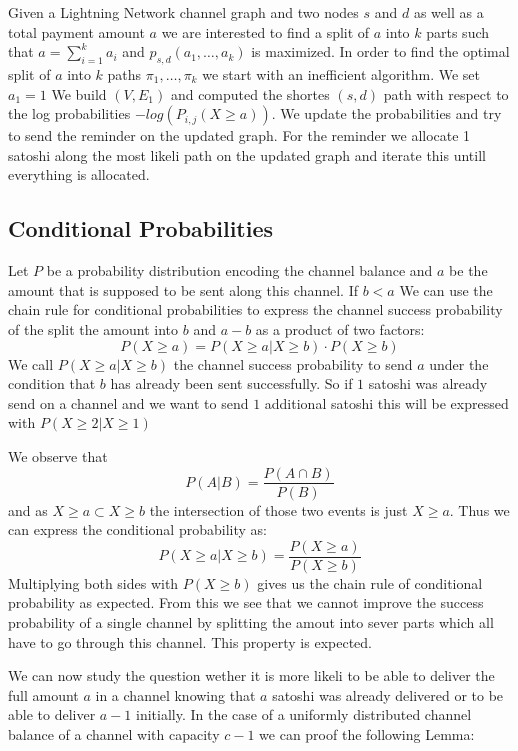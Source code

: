 \documentclass[10pt,twocolumn]{article}
\begin{document}
Given a Lightning Network channel graph and two nodes $s$ and $d$ as well as a total payment amount $a$ we are interested to find a split of $a$ into $k$ parts such that $a=\sum_{i=1}^ka_i$ and $p_{s,d}(a_1,\dots,a_k)$ is maximized.
In order to find the optimal split of $a$ into $k$ paths $\pi_1,\dots,\pi_k$ we start with an inefficient algorithm.
We set $a_1 = 1$
We build $(V,E_1)$ and computed the shortes $(s,d)$ path with respect to the log probabilities $-log(P_{i,j}(X \geq a))$.
We update the probabilities and try to send the reminder on the updated graph.
For the reminder we allocate 1 satoshi along the most likeli path on the updated graph and iterate this untill everything is allocated.

\subsection{Conditional Probabilities}
Let $P$ be a probability distribution encoding the channel balance and $a$ be the amount that is supposed to be sent along this channel.
If $b<a$ We can use the chain rule for conditional probabilities to express the channel success probability of the split the amount into $b$ and $a-b$ as a product of two factors:
\[
P(X \geq a) = P(X \geq a | X \geq b)\cdot P(X \geq b)
\]
We call $P(X\geq a | X \geq b)$ the channel success probability to send $a$ under the condition that $b$ has already been sent successfully.
So if $1$ satoshi was already send on a channel and we want to send $1$ additional satoshi this will be expressed with $P(X\geq 2 | X \geq 1)$

We observe that
\[
P(A|B)=\frac{P(A\cap B)}{P(B)}
\]
and as $X \geq a \subset X \geq b$ the intersection of those two events is just $X\geq a$.
Thus we can express the conditional probability as:
\[
P(X\geq a| X\geq b) = \frac{P(X \geq a)}{P(X\geq b)}
\]
Multiplying both sides with $P(X\geq b)$ gives us the chain rule of conditional probability as expected.
From this we see that we cannot improve the success probability of a single channel by splitting the amout into sever parts which all have to go through this channel.
This property is expected.

We can now study the question wether it is more likeli to be able to deliver the full amount $a$ in a channel knowing that $a$ satoshi was already delivered or to be able to deliver $a-1$ initially.
In the case of a uniformly distributed channel balance of a channel with capacity $c-1$ we can proof the following Lemma:
\end{document}
